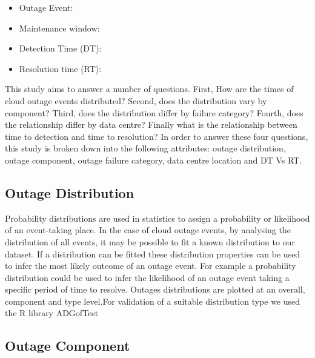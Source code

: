 \documentclass[conference]{IEEEtran}
\begin{document}
\begin{itemize}
 \item Outage Event: 
 \item  Maintenance window: 
 \item Detection Time (DT):
\item Resolution time (RT):
\end{itemize}

This study aims to answer a number of questions. First, How are the times of cloud outage events distributed? Second, does the distribution vary by component? Third, does the distribution differ by failure category? Fourth, does the relationship differ by data centre? Finally what is the relationship between time to detection and time to resolution? In order to answer these four questions, this study is broken down into the following attributes: outage distribution, outage component, outage failure category, data centre location and DT Vs RT. \par


\subsection{Outage Distribution}

Probability distributions are used in statistics to assign a probability or likelihood of an event-taking place. In the case of cloud outage events, by analysing the distribution of all events, it may be possible to fit a known distribution to our dataset. If a distribution can be fitted these distribution properties can be used to infer the most likely outcome of an outage event. For example a probability distribution could be used to infer the likelihood of an outage event taking a specific period of time to resolve. Outages distributions are plotted at an overall, component and type level.For validation of a suitable distribution type we used the R library ADGofTest \cite{ADGoF}

\subsection{Outage Component}
\end{document}
